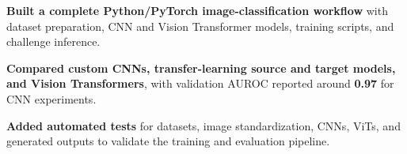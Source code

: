 \begin{bullets}
    \item \textbf{Built a complete Python/PyTorch image-classification workflow} with dataset preparation, CNN and Vision Transformer models, training scripts, and challenge inference.
    \item \textbf{Compared custom CNNs, transfer-learning source and target models, and Vision Transformers}, with validation AUROC reported around \textbf{0.97} for CNN experiments.
    \item \textbf{Added automated tests} for datasets, image standardization, CNNs, ViTs, and generated outputs to validate the training and evaluation pipeline.
\end{bullets}
